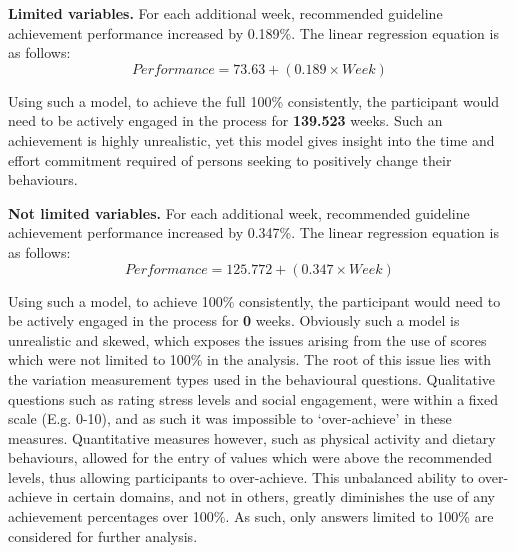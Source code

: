 \textbf{Limited variables.}
For each additional week, recommended guideline achievement performance increased by 0.189\%. The linear regression equation is as follows:
\begin{equation}
Performance = 73.63 + \left(0.189 \times Week\right)
          \label{eq: calc-performance-limited-behaviour-change}
\end{equation}

Using such a model, to achieve the full 100\% consistently, the participant would need to be actively engaged in the process for \textbf{139.523} weeks. Such an achievement is highly unrealistic, yet this model gives insight into the time and effort commitment required of persons seeking to positively change their behaviours.

\textbf{Not limited variables.}
For each additional week, recommended guideline achievement performance increased by 0.347\%. The linear regression equation is as follows:
\begin{equation}
Performance = 125.772 + \left(0.347 \times Week\right)
          \label{eq: calc-performance-notlimited-behaviour-change}
\end{equation}

Using such a model, to achieve 100\% consistently, the participant would need to be actively engaged in the process for \textbf{0} weeks. Obviously such a model is unrealistic and skewed, which exposes the issues arising from the use of scores which were not limited to 100\% in the analysis. The root of this issue lies with the variation measurement types used in the behavioural questions. Qualitative questions such as rating stress levels and social engagement, were within a fixed scale (E.g. 0-10), and as such it was impossible to `over-achieve' in these measures. Quantitative measures however, such as physical activity and dietary behaviours, allowed for the entry of values which were above the recommended levels, thus allowing participants to over-achieve. This unbalanced ability to over-achieve in certain domains, and not in others, greatly diminishes the use of any achievement percentages over 100\%. As such, only answers limited to 100\% are considered for further analysis.

